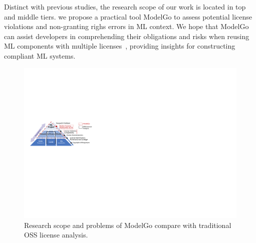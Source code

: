Distinct with previous studies, the research scope of our work is located in top and middle tiers.
we propose a practical tool ModelGo to assess potential license violations and non-granting righs errors in ML context.
We hope that ModelGo can assist developers in comprehending their obligations and risks when reusing ML components with multiple licenses~\cite{almeida2017software}, providing insights for constructing compliant ML systems.


\begin{figure}[t]
    \centering
    \includegraphics[width=\linewidth]{fig/pyramid.pdf}
    \caption{Research scope and problems of ModelGo compare with traditional OSS license analysis.}
    \Description{}
    \label{fig:pyramid}
\end{figure}



